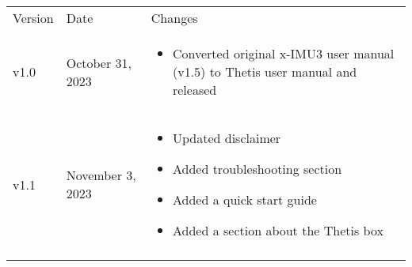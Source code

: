 
\begingroup
    \def\arraystretch{1.5}
    \begin{longtable}{| >{\centering}p{} | p{} | >{\raggedright\arraybackslash}p{} |}
        \arrayrulecolor{gray!50}\hline
        Version & Date & Changes\\
        \arrayrulecolor{gray!50}\hline
        v1.0 & October 31, 2023 &
        \begin{itemize}
            \item Converted original x-IMU3 user manual (v1.5) to Thetis user manual and released
        \end{itemize}\\
        v1.1 & November 3, 2023 &
        \begin{itemize}
            \item Updated disclaimer
            \item Added troubleshooting section
            \item Added a quick start guide
            \item Added a section about the Thetis box
        \end{itemize}\\
        \arrayrulecolor{gray!50}\hline
    \end{longtable}
\endgroup
